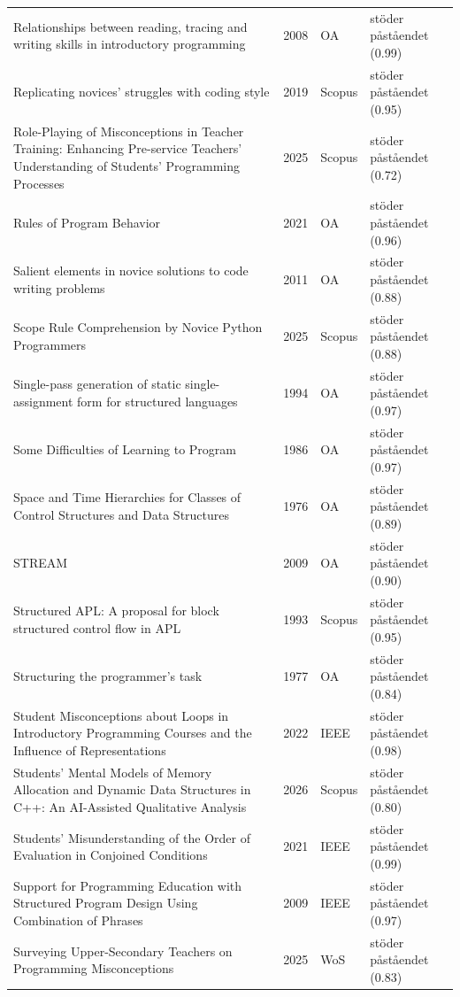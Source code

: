 \begin{longtable}{@{}%
  >{\raggedright\arraybackslash}p{}c%
  >{\raggedright\arraybackslash}p{}%
  >{\raggedright\arraybackslash}p{}@{}}
Relationships between reading, tracing and writing skills in introductory programming & 2008 & OA & stöder påståendet (0.99) \\
Replicating novices' struggles with coding style & 2019 & Scopus & stöder påståendet (0.95) \\
Role-Playing of Misconceptions in Teacher Training: Enhancing Pre-service Teachers' Understanding of Students' Programming Processes & 2025 & Scopus & stöder påståendet (0.72) \\
Rules of Program Behavior & 2021 & OA & stöder påståendet (0.96) \\
Salient elements in novice solutions to code writing problems & 2011 & OA & stöder påståendet (0.88) \\
Scope Rule Comprehension by Novice Python Programmers & 2025 & Scopus & stöder påståendet (0.88) \\
Single-pass generation of static single-assignment form for structured languages & 1994 & OA & stöder påståendet (0.97) \\
Some Difficulties of Learning to Program & 1986 & OA & stöder påståendet (0.97) \\
Space and Time Hierarchies for Classes of Control Structures and Data Structures & 1976 & OA & stöder påståendet (0.89) \\
STREAM & 2009 & OA & stöder påståendet (0.90) \\
Structured APL: A proposal for block structured control flow in APL & 1993 & Scopus & stöder påståendet (0.95) \\
Structuring the programmer's task & 1977 & OA & stöder påståendet (0.84) \\
Student Misconceptions about Loops in Introductory Programming Courses and the Influence of Representations & 2022 & IEEE & stöder påståendet (0.98) \\
Students' Mental Models of Memory Allocation and Dynamic Data Structures in C++: An AI-Assisted Qualitative Analysis & 2026 & Scopus & stöder påståendet (0.80) \\
Students' Misunderstanding of the Order of Evaluation in Conjoined Conditions & 2021 & IEEE & stöder påståendet (0.99) \\
Support for Programming Education with Structured Program Design Using Combination of Phrases & 2009 & IEEE & stöder påståendet (0.97) \\
Surveying Upper-Secondary Teachers on Programming Misconceptions & 2025 & WoS & stöder påståendet (0.83) \\

\end{longtable}
